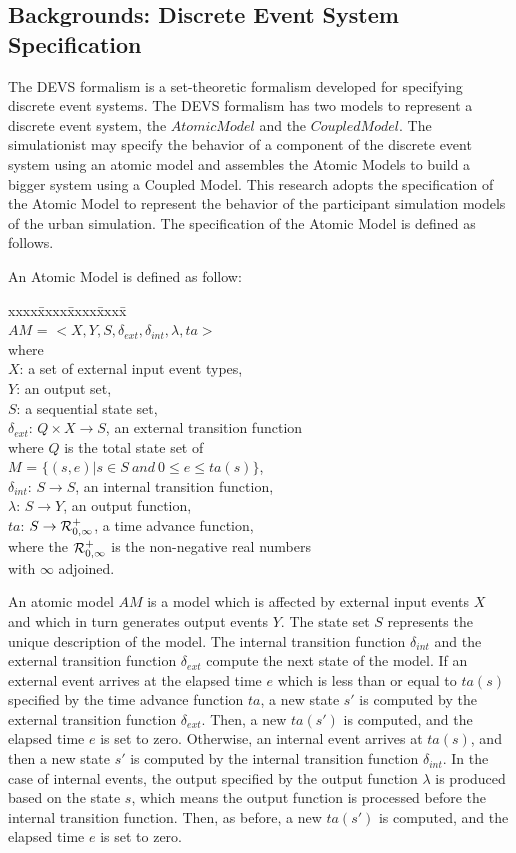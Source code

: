 \documentclass{scsSimAUDPaperFormat}
\begin{document}
\subsection{Backgrounds: Discrete Event System Specification}
The DEVS formalism is a set-theoretic formalism developed for specifying discrete event systems. The DEVS formalism has two models to represent a discrete event system, the $Atomic Model$ and the $Coupled Model$. 
The simulationist may specify the behavior of a component of the discrete event system using an atomic model and assembles the Atomic Models to build a bigger system using a Coupled Model. This research adopts the specification of the Atomic Model to represent the behavior of the participant simulation models of the urban simulation. The specification of the Atomic Model is defined as follows.

An Atomic Model is defined as follow:
\begin{tabbing}
xxxx\=xxxx\=xxxx\=xxxx\=\kill\\
\> \> \> $AM$ = $<X, Y, S, \delta_{ext}, \delta_{int}, \lambda, ta>$\\
where\\
\> $X$: a set of external input event types,\\
\> $Y$: an output set,\\
\> $S$: a sequential state set,\\
\> $\delta_{ext}$: $Q \times X \rightarrow S$, an external transition function\\
\> \> where $Q$ is the total state set of \\
\> \> $M$ = $\{(s,e)|s \in S\:and\:0 \leq e \leq ta(s)\}$,\\
\> $\delta_{int}$: $S \rightarrow S$, an internal transition function,\\
\> $\lambda$: $S \rightarrow Y$, an output function,\\
\> $ta$: $S \rightarrow {\cal R}^{+}_{0,\infty}$, a time advance function, \\
\> \> where the ${\cal R}^{+}_{0,\infty}$ is the non-negative real numbers \\
\> \> with $\infty$ adjoined.
\end{tabbing}

An atomic model $AM$ is a model which is affected by external input events
$X$ and which in turn generates output events $Y$.
The state set $S$ represents the unique description of the model.
The internal transition function $\delta_{int}$ and the external transition
function $\delta_{ext}$ compute the next state of the model.
If an external event arrives at the elapsed time $e$ which is less than or
equal to $ta(s)$ specified by the time advance function $ta$, a new
state $s'$ is computed by the external transition function $\delta_{ext}$.
Then, a new $ta(s')$ is computed, and the elapsed time $e$ is set to zero.
Otherwise, an internal event arrives at $ta(s)$, and then a new state
$s'$ is computed by the internal transition function $\delta_{int}$.
In the case of internal events, the output specified by the output function
$\lambda$ is produced based on the state $s$, which means the output function
is processed before the internal transition function.
Then, as before, a new $ta(s')$ is computed, and the elapsed time $e$ is set to zero. 
\end{document}
